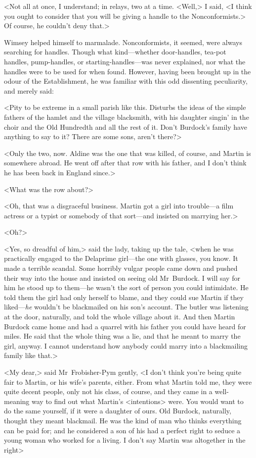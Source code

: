 <Not all at once, I understand; in relays, two at a time. <Well,> I said, <I think you ought to consider that you will be giving a handle to the Nonconformists.> Of course, he couldn't deny that.>

Wimsey helped himself to marmalade. Nonconformists, it seemed, were always searching for handles. Though what kind—whether door-handles, tea-pot handles, pump-handles, or starting-handles—was never explained, nor what the handles were to be used for when found. However, having been brought up in the odour of the Establishment, he was familiar with this odd dissenting peculiarity, and merely said:

<Pity to be extreme in a small parish like this. Disturbs the ideas of the simple fathers of the hamlet and the village blacksmith, with his daughter singin' in the choir and the Old Hundredth and all the rest of it. Don't Burdock's family have anything to say to it? There are some sons, aren't there?>

<Only the two, now. Aldine was the one that was killed, of course, and Martin is somewhere abroad. He went off after that row with his father, and I don't think he has been back in England since.>

<What was the row about?>

<Oh, that was a disgraceful business. Martin got a girl into trouble—a film actress or a typist or somebody of that sort—and insisted on marrying her.>

<Oh?>

<Yes, so dreadful of him,> said the lady, taking up the tale, <when he was practically engaged to the Delaprime girl—the one with glasses, you know. It made a terrible scandal. Some horribly vulgar people came down and pushed their way into the house and insisted on seeing old Mr~Burdock. I will say for him he stood up to them—he wasn't the sort of person you could intimidate. He told them the girl had only herself to blame, and they could sue Martin if they liked—\emph{he} wouldn't be blackmailed on his son's account. The butler was listening at the door, naturally, and told the whole village about it. And then Martin Burdock came home and had a quarrel with his father you could have heard for miles. He said that the whole thing was a lie, and that he meant to marry the girl, anyway. I cannot understand how anybody could marry into a blackmailing family like that.>

<My dear,> said Mr~Frobisher-Pym gently, <I don't think you're being quite fair to Martin, or his wife's parents, either. From what Martin told me, they were quite decent people, only not his class, of course, and they came in a well-meaning way to find out what Martin's <intentions> were. You would want to do the same yourself, if it were a daughter of ours. Old Burdock, naturally, thought they meant blackmail. He was the kind of man who thinks everything can be paid for; and he considered a son of his had a perfect right to seduce a young woman who worked for a living. I don't say Martin was altogether in the right\longdash>

